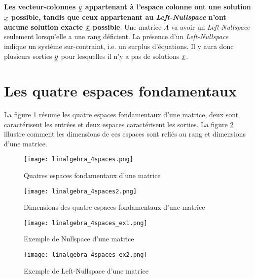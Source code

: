 \textbf{Les vecteur-colonnes $\underline{y}$ appartenant à l'espace colonne ont une solution $\underline{x}$ possible, tandis que ceux appartenant au \textit{Left-Nullspace} n'ont aucune solution exacte $\underline{x}$ possible}.
%
Une matrice $A$ va avoir un \textit{Left-Nullspace} seulement lorsqu'elle a une rang déficient. La présence d'un \textit{Left-Nullspace} indique un système sur-contraint, i.e. un surplus d'équations. Il y aura donc plusieurs sorties $\underline{y}$ pour lesquelles il n'y a pas de solutions $\underline{x}$.


\newpage
\section{Les quatre espaces fondamentaux}
\label{sec:4espfond}

La figure \ref{fig:4spaces} résume les quatre espaces fondamentaux d'une matrice, deux sont caractérisent les entrées et deux espaces caractérisent les sorties. La figure \ref{fig:4spaces2} illustre comment les dimensions de ces espaces sont reliés au rang et dimensions d'une matrice.

\begin{figure}[H]
	\centering
		\texttt{[image: linalgebra\_4spaces.png]}
	\caption{Quatres espaces fondamentaux d'une matrice}
	\label{fig:4spaces}
\end{figure}

\begin{figure}[H]
	\centering
		\texttt{[image: linalgebra\_4spaces2.png]}
	\caption{Dimensions des quatre espaces fondamentaux d'une matrice}
	\label{fig:4spaces2}
\end{figure}

\begin{figure}[H]
	\centering
		\texttt{[image: linalgebra\_4spaces\_ex1.png]}
	\caption{Exemple de Nullspace d'une matrice}
	\label{fig:4spaces_ex1}
\end{figure}

\begin{figure}[H]
	\centering
		\texttt{[image: linalgebra\_4spaces\_ex2.png]}
	\caption{Exemple de Left-Nullspace d'une matrice}
	\label{fig:4spaces_ex2}
\end{figure}


